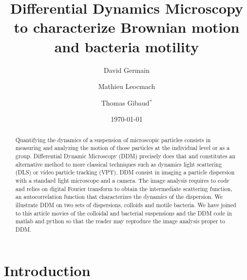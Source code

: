 \documentclass[%
 aip,
 jmp,%
 amsmath,amssymb,
reprint,%
]{revtex4-1}
\begin{document}

\title[Differential Dynamics Microscopy to characterize Brownian motion and bacteria motility]{Differential Dynamics Microscopy\\ to characterize Brownian motion and bacteria motility}%

\author{David Germain}
\author{Mathieu Leocmach}
\author{Thomas Gibaud$^*$}

\date{\today}%

\begin{abstract}
Quantifying the dynamics of a suspension of microscopic particles consists in measuring and analyzing the motion of those particles at the individual level or as a group.  Differential Dynamic Microscopy (DDM) precisely does that and constitutes an alternative method to more classical techniques such as dynamics light scattering (DLS) or video particle tracking (VPT). DDM consist in imaging a particle dispersion with a standard light microscope and a camera. The image analysis requires to code and  relies on digital Fourier transform to obtain the intermediate scattering function, an autocorrelation function that characterizes the dynamics of the dispersion. We illustrate DDM on two sets of dispersions, colloids and motile bacteria. We have joined to this article movies of the  colloidal and bacterial suspensions and the DDM code in matlab and python so that the reader may reproduce the image analysis proper to DDM.
\end{abstract}

\maketitle

\section{\label{sec:level1}Introduction}
\end{document}
